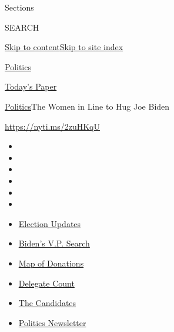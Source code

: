 Sections

SEARCH

\protect\hyperlink{site-content}{Skip to
content}\protect\hyperlink{site-index}{Skip to site index}

\href{https://www.nytimes.com/section/politics}{Politics}

\href{https://myaccount.nytimes.com/auth/login?response_type=cookie\&client_id=vi}{}

\href{https://www.nytimes.com/section/todayspaper}{Today's Paper}

\href{/section/politics}{Politics}\textbar{}The Women in Line to Hug Joe
Biden

\url{https://nyti.ms/2zuHKqU}

\begin{itemize}
\item
\item
\item
\item
\item
\item
\end{itemize}

\begin{itemize}
\item
  \href{https://www.nytimes.com/2020/07/31/us/elections/biden-vs-trump.html?action=click\&pgtype=Article\&state=default\&region=TOP_BANNER\&context=storylines_menu}{Election
  Updates}
\item
  \href{https://www.nytimes.com/article/biden-vice-president-2020.html?action=click\&pgtype=Article\&state=default\&region=TOP_BANNER\&context=storylines_menu}{Biden's
  V.P. Search}
\item
  \href{https://www.nytimes.com/interactive/2020/07/24/us/politics/trump-biden-campaign-donors.html?action=click\&pgtype=Article\&state=default\&region=TOP_BANNER\&context=storylines_menu}{Map
  of Donations}
\item
  \href{https://www.nytimes.com/interactive/2020/us/elections/delegate-count-primary-results.html?action=click\&pgtype=Article\&state=default\&region=TOP_BANNER\&context=storylines_menu}{Delegate
  Count}
\item
  \href{https://www.nytimes.com/interactive/2019/us/politics/2020-presidential-candidates.html?action=click\&pgtype=Article\&state=default\&region=TOP_BANNER\&context=storylines_menu}{The
  Candidates}
\item
  \href{https://www.nytimes.com/newsletters/politics?action=click\&pgtype=Article\&state=default\&region=TOP_BANNER\&context=storylines_menu}{Politics
  Newsletter}
\end{itemize}

